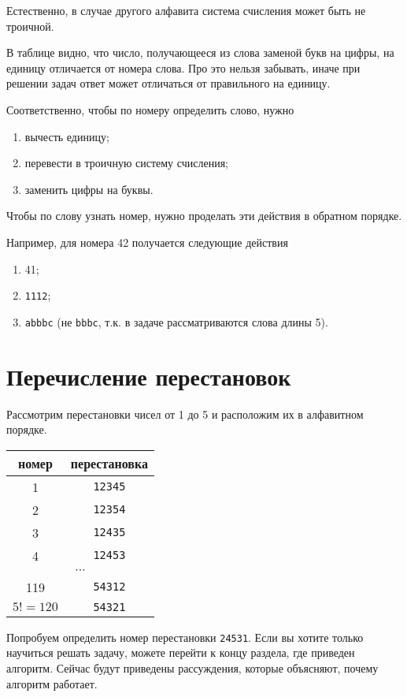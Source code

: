 \documentclass{article}
\begin{document}
Естественно, в случае другого алфавита система счисления может быть не троичной.

В таблице видно, что число, получающееся из слова заменой букв на цифры, на единицу отличается от номера слова. Про это нельзя забывать, иначе при решении задач ответ может отличаться от правильного на единицу.

Соответственно, чтобы по номеру определить слово, нужно
\begin{enumerate}
	\item вычесть единицу;
	\item перевести в троичную систему счисления;
	\item заменить цифры на буквы.
\end{enumerate}

Чтобы по слову узнать номер, нужно проделать эти действия в обратном порядке.

Например, для номера 42 получается следующие действия
\begin{enumerate}
	\item 41;
	\item \verb|1112|;
	\item \verb|abbbc| (не \verb|bbbc|, т.к. в задаче рассматриваются слова длины 5).
\end{enumerate}

\section{Перечисление перестановок}
Рассмотрим перестановки чисел от 1 до 5 и расположим их в алфавитном порядке.

\begin{center}
	\begin{tabular}{cc}
		номер & перестановка \\
		\hline
		1 & \verb|12345| \\
		2 & \verb|12354| \\
		3 & \verb|12435| \\
		4 & \verb|12453| \\
		\multicolumn{2}{c}{$\cdots$} \\
		119 & \verb|54312| \\
		$5!=120$ & \verb|54321|
	\end{tabular}
\end{center}

Попробуем определить номер перестановки \verb|24531|. Если вы хотите только научиться решать задачу, можете перейти к концу раздела, где приведен алгоритм. Сейчас будут приведены рассуждения, которые объясняют, почему алгоритм работает.
\end{document}
